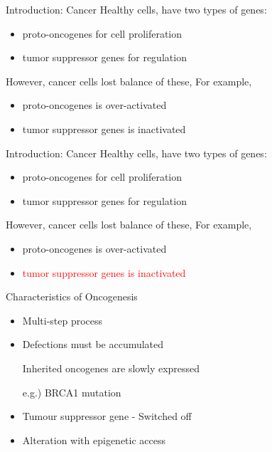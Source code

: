 \documentclass{beamer}
\begin{document}
    \begin{frame}{Introduction: Cancer}
        Healthy cells, have two types of genes:
        \begin{itemize}
            \item proto-oncogenes for cell proliferation
            \item tumor suppressor genes for regulation
        \end{itemize}

        However, cancer cells lost balance of these, For example,
        \begin{itemize}
            \item proto-oncogenes is over-activated
            \item tumor suppressor genes is inactivated
        \end{itemize}
    \end{frame}

    \begin{frame}{Introduction: Cancer}
        Healthy cells, have two types of genes:
        \begin{itemize}
            \item proto-oncogenes for cell proliferation
            \item tumor suppressor genes for regulation
        \end{itemize}

        However, cancer cells lost balance of these, For example,
        \begin{itemize}
            \item proto-oncogenes is over-activated
            \item \textcolor{red}{tumor suppressor genes is inactivated}
        \end{itemize}
    \end{frame}

    \begin{frame}{Characteristics of Oncogenesis}
        \begin{itemize}
            \item Multi-step process
            \item Defections must be accumulated
                  
                  \vspace{1em}
                  {\small Inherited oncogenes are slowly expressed 
                  
                  e.g.) BRCA1 mutation}
                  \vspace{1em}

            \item Tumour suppressor gene - Switched off
            \item Alteration with epigenetic access
        \end{itemize}
    \end{frame}
\end{document}
